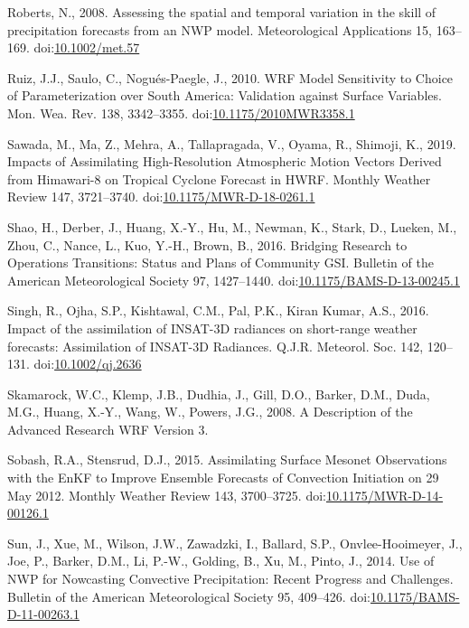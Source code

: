 \documentclass[authoryear,preprint,review,12pt]{elsarticle} %
\begin{document}
\leavevmode\hypertarget{ref-roberts2008}{}%
Roberts, N., 2008. Assessing the spatial and temporal variation in the skill of precipitation forecasts from an NWP model. Meteorological Applications 15, 163--169. doi:\href{https://doi.org/10.1002/met.57}{10.1002/met.57}

\leavevmode\hypertarget{ref-ruiz2010}{}%
Ruiz, J.J., Saulo, C., Nogués-Paegle, J., 2010. WRF Model Sensitivity to Choice of Parameterization over South America: Validation against Surface Variables. Mon. Wea. Rev. 138, 3342--3355. doi:\href{https://doi.org/10.1175/2010MWR3358.1}{10.1175/2010MWR3358.1}

\leavevmode\hypertarget{ref-sawada2019}{}%
Sawada, M., Ma, Z., Mehra, A., Tallapragada, V., Oyama, R., Shimoji, K., 2019. Impacts of Assimilating High-Resolution Atmospheric Motion Vectors Derived from Himawari-8 on Tropical Cyclone Forecast in HWRF. Monthly Weather Review 147, 3721--3740. doi:\href{https://doi.org/10.1175/MWR-D-18-0261.1}{10.1175/MWR-D-18-0261.1}

\leavevmode\hypertarget{ref-shao2016}{}%
Shao, H., Derber, J., Huang, X.-Y., Hu, M., Newman, K., Stark, D., Lueken, M., Zhou, C., Nance, L., Kuo, Y.-H., Brown, B., 2016. Bridging Research to Operations Transitions: Status and Plans of Community GSI. Bulletin of the American Meteorological Society 97, 1427--1440. doi:\href{https://doi.org/10.1175/BAMS-D-13-00245.1}{10.1175/BAMS-D-13-00245.1}

\leavevmode\hypertarget{ref-singh2016}{}%
Singh, R., Ojha, S.P., Kishtawal, C.M., Pal, P.K., Kiran Kumar, A.S., 2016. Impact of the assimilation of INSAT-3D radiances on short-range weather forecasts: Assimilation of INSAT-3D Radiances. Q.J.R. Meteorol. Soc. 142, 120--131. doi:\href{https://doi.org/10.1002/qj.2636}{10.1002/qj.2636}

\leavevmode\hypertarget{ref-skamarock2008}{}%
Skamarock, W.C., Klemp, J.B., Dudhia, J., Gill, D.O., Barker, D.M., Duda, M.G., Huang, X.-Y., Wang, W., Powers, J.G., 2008. A Description of the Advanced Research WRF Version 3.

\leavevmode\hypertarget{ref-sobash2015}{}%
Sobash, R.A., Stensrud, D.J., 2015. Assimilating Surface Mesonet Observations with the EnKF to Improve Ensemble Forecasts of Convection Initiation on 29 May 2012. Monthly Weather Review 143, 3700--3725. doi:\href{https://doi.org/10.1175/MWR-D-14-00126.1}{10.1175/MWR-D-14-00126.1}

\leavevmode\hypertarget{ref-sun2014}{}%
Sun, J., Xue, M., Wilson, J.W., Zawadzki, I., Ballard, S.P., Onvlee-Hooimeyer, J., Joe, P., Barker, D.M., Li, P.-W., Golding, B., Xu, M., Pinto, J., 2014. Use of NWP for Nowcasting Convective Precipitation: Recent Progress and Challenges. Bulletin of the American Meteorological Society 95, 409--426. doi:\href{https://doi.org/10.1175/BAMS-D-11-00263.1}{10.1175/BAMS-D-11-00263.1}
\end{document}
